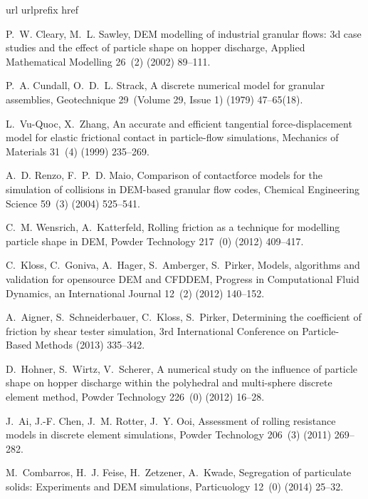 \documentclass[review]{elsarticle}
\begin{document}
\begin{thebibliography}{10}
\expandafter\ifx\csname url\endcsname\relax
  \def\url#1{\texttt{#1}}\fi
\expandafter\ifx\csname urlprefix\endcsname\relax\def\urlprefix{URL }\fi
\expandafter\ifx\csname href\endcsname\relax
  \def\href#1#2{#2} \def\path#1{#1}\fi

P.~W. Cleary, M.~L. Sawley, DEM modelling of industrial granular flows: 3d case
  studies and the effect of particle shape on hopper discharge, Applied
  Mathematical Modelling 26~(2) (2002) 89--111.

P.~A. Cundall, O.~D.~L. Strack, A discrete numerical model for granular
  assemblies, Geotechnique 29~(Volume 29, Issue 1) (1979) 47--65(18).

L.~Vu-Quoc, X.~Zhang, An accurate and efficient tangential force-displacement
  model for elastic frictional contact in particle-flow simulations, Mechanics
  of Materials 31~(4) (1999) 235--269.

A.~D. Renzo, F.~P.~D. Maio, Comparison of contactforce models for the
  simulation of collisions in DEM-based granular flow codes, Chemical
  Engineering Science 59~(3) (2004) 525--541.

C.~M. Wensrich, A.~Katterfeld, Rolling friction as a technique for modelling
  particle shape in DEM, Powder Technology 217~(0) (2012) 409--417.

C.~Kloss, C.~Goniva, A.~Hager, S.~Amberger, S.~Pirker, Models, algorithms and
  validation for opensource DEM and CFDDEM, Progress in Computational Fluid
  Dynamics, an International Journal 12~(2) (2012) 140--152.

A.~Aigner, S.~Schneiderbauer, C.~Kloss, S.~Pirker, Determining the coefficient
  of friction by shear tester simulation, 3rd International Conference on
  Particle-Based Methods (2013) 335--342.

D.~Hohner, S.~Wirtz, V.~Scherer, A numerical study on the influence of particle
  shape on hopper discharge within the polyhedral and multi-sphere discrete
  element method, Powder Technology 226~(0) (2012) 16--28.

J.~Ai, J.-F. Chen, J.~M. Rotter, J.~Y. Ooi, Assessment of rolling resistance
  models in discrete element simulations, Powder Technology 206~(3) (2011)
  269--282.

M.~Combarros, H.~J. Feise, H.~Zetzener, A.~Kwade, Segregation of particulate
  solids: Experiments and DEM simulations, Particuology 12~(0) (2014) 25--32.


\end{thebibliography}
\end{document}

